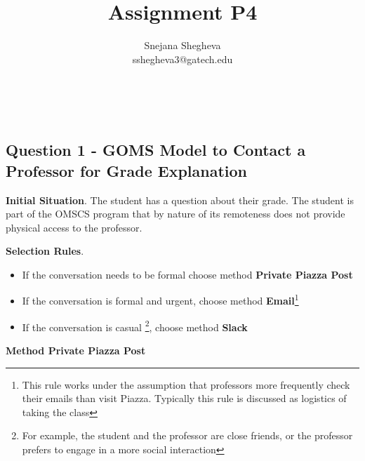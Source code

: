 \documentclass[12pt,letterpaper]{article}
\makeatletter
\renewcommand{\maketitle}{\bgroup
   \begin{center}
   \textbf{{\fontsize{18pt}{20}\selectfont \@title}}\\
   \vspace{10pt}
   {\fontsize{12pt}{0}\selectfont \@author} 
   \end{center}
}
\makeatother
\begin{document}
\title{Assignment P4}
\author{Snejana Shegheva \\ sshegheva3@gatech.edu}

\maketitle
\thispagestyle{fancy}

\subsection*{Question 1 - GOMS Model to Contact a Professor for Grade Explanation}

\textbf{Initial Situation}. The student has a question about their grade. The student is part of the OMSCS program that by nature of its remoteness does not provide physical access to the professor.

\textbf{Selection Rules}.

\begin{itemize}
    \itemsep0em 
    \item If the conversation needs to be formal choose method \textbf{Private Piazza Post}
    \item If the conversation is formal and urgent, choose method \textbf{Email}\footnote{This rule works under the assumption that professors more frequently check their emails than visit Piazza. Typically this rule is discussed as logistics of taking the class}
    \item If the conversation is casual \footnote{For example, the student and the professor are close friends, or the professor prefers to engage in a more social interaction}, choose method \textbf{Slack}
\end{itemize}

\textbf{Method Private Piazza Post}
\end{document}

